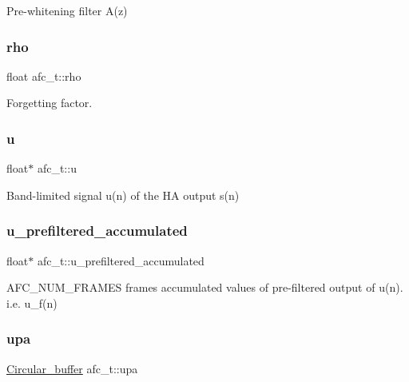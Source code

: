 Pre-\/whitening filter A(z) 

\mbox{\label{structafc__t_a8edae5604a2d189f1e83b71678566cad}} 
\subsubsection{\texorpdfstring{rho}{rho}}
{\footnotesize\ttfamily float afc\+\_\+t\+::rho}



Forgetting factor. 

\mbox{\label{structafc__t_aa69482203264d41b13f96cda153faec3}} 
\subsubsection{\texorpdfstring{u}{u}}
{\footnotesize\ttfamily float$\ast$ afc\+\_\+t\+::u}



Band-\/limited signal u(n) of the HA output s(n) 

\mbox{\label{structafc__t_af7b50d899dcdfc8c68f6866764861f5f}} 
\subsubsection{\texorpdfstring{u\+\_\+prefiltered\+\_\+accumulated}{u\_prefiltered\_accumulated}}
{\footnotesize\ttfamily float$\ast$ afc\+\_\+t\+::u\+\_\+prefiltered\+\_\+accumulated}



A\+F\+C\+\_\+\+N\+U\+M\+\_\+\+F\+R\+A\+M\+ES frames accumulated values of pre-\/filtered output of u(n). i.\+e. u\+\_\+f(n) 

\mbox{\label{structafc__t_a11328ef1f3d92c69c404c5df7761116a}} 
\subsubsection{\texorpdfstring{upa}{upa}}
{\footnotesize\ttfamily \mbox{\hyperlink{circular__buffer_8h_aa88184dd60879f696cb2e679d0e50b45}{Circular\+\_\+buffer}} afc\+\_\+t\+::upa}


